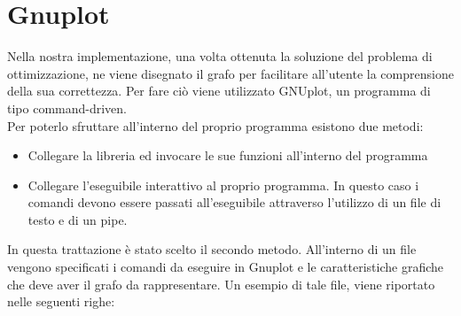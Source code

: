 \chapter{Gnuplot}\label{gnuplot}
Nella nostra implementazione, una volta ottenuta la soluzione del problema di ottimizzazione, ne viene disegnato il grafo per facilitare all'utente la comprensione della sua correttezza. Per fare ciò viene utilizzato GNUplot, un programma di tipo command-driven.\\
Per poterlo sfruttare all'interno del proprio programma esistono due metodi:
\begin{itemize}
\item{Collegare la libreria ed invocare le sue funzioni all'interno del programma}
\item{Collegare l'eseguibile interattivo al proprio programma. In questo caso i comandi devono essere passati all'eseguibile attraverso l'utilizzo di un file di testo e di un pipe.}\\
\end{itemize}
In questa trattazione è stato scelto il secondo metodo. All'interno di un file vengono specificati i comandi da eseguire in Gnuplot e le caratteristiche grafiche che deve aver il grafo da rappresentare. Un esempio di tale file, viene riportato nelle seguenti righe:\\



